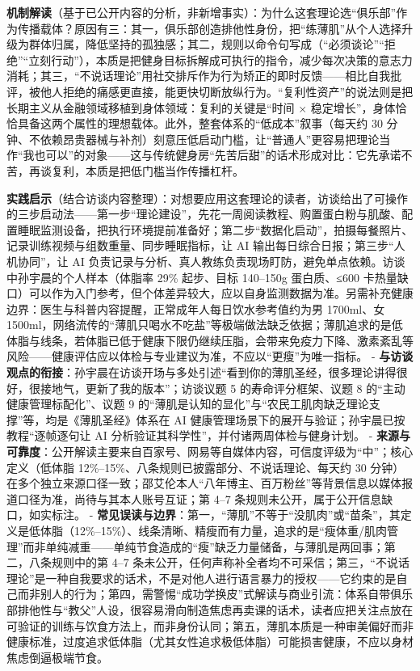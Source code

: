 \textbf{机制解读}（基于已公开内容的分析，非新增事实）：为什么这套理论选``俱乐部''作为传播载体？原因有三：其一，俱乐部创造排他性身份，把``练薄肌''从个人选择升级为群体归属，降低坚持的孤独感；其二，规则以命令句写成（``必须谈论''``拒绝''``立刻行动''），本质是把健身目标拆解成可执行的指令，减少每次决策的意志力消耗；其三，``不说话理论''用社交排斥作为行为矫正的即时反馈------相比自我批评，被他人拒绝的痛感更直接，能更快切断放纵行为。``复利性资产''的说法则是把长期主义从金融领域移植到身体领域：复利的关键是``时间
×
稳定增长''，身体恰恰具备这两个属性的理想载体。此外，整套体系的``低成本''叙事（每天约
30
分钟、不依赖昂贵器械与补剂）刻意压低启动门槛，让``普通人''更容易把理论当作``我也可以''的对象------这与传统健身房``先苦后甜''的话术形成对比：它先承诺不苦，再谈复利，本质是把低门槛当作传播杠杆。

\textbf{实践启示}（结合访谈内容整理）：对想要应用这套理论的读者，访谈给出了可操作的三步启动法------第一步``理论建设''，先花一周阅读教程、购置蛋白粉与肌酸、配置睡眠监测设备，把执行环境提前准备好；第二步``数据化启动''，拍摄每餐照片、记录训练视频与组数重量、同步睡眠指标，让
AI 输出每日综合日报；第三步``人机协同''，让 AI
负责记录与分析、真人教练负责现场盯防，避免单点依赖。访谈中孙宇晨的个人样本（体脂率
29\% 起步、目标 140--150g 蛋白质、≤600
卡热量缺口）可以作为入门参考，但个体差异较大，应以自身监测数据为准。另需补充健康边界：医生与科普内容提醒，正常成年人每日饮水参考值约为男
1700ml、女
1500ml，网络流传的``薄肌只喝水不吃盐''等极端做法缺乏依据；薄肌追求的是低体脂与线条，若体脂已低于健康下限仍继续压脂，会带来免疫力下降、激素紊乱等风险------健康评估应以体检与专业建议为准，不应以``更瘦''为唯一指标。
-
\textbf{与访谈观点的衔接}：孙宇晨在访谈开场与多处引述``看到你的薄肌圣经，很多理论讲得很好，很接地气，更新了我的版本''；访谈议题
5 的寿命评分框架、议题 8 的``主动健康管理标配化''、议题 9
的``薄肌是认知的显化''与``农民工肌肉缺乏理论支撑''等，均是《薄肌圣经》体系在
AI 健康管理场景下的展开与验证；孙宇晨已按教程``逐帧逐句让 AI
分析验证其科学性''，并付诸两周体检与健身计划。 -
\textbf{来源与可靠度}：公开解读主要来自百家号、网易等自媒体内容，可信度评级为``中''；核心定义（低体脂
12\%--15\%、八条规则已披露部分、不说话理论、每天约 30
分钟）在多个独立来源口径一致；邵艾伦本人``八年博主、百万粉丝''等背景信息以媒体报道口径为准，尚待与其本人账号互证；第
4--7 条规则未公开，属于公开信息缺口，如实标注。 -
\textbf{常见误读与边界}：第一，``薄肌''不等于``没肌肉''或``苗条''，其定义是低体脂（12\%--15\%）、线条清晰、精瘦而有力量，追求的是``瘦体重/肌肉管理''而非单纯减重------单纯节食造成的``瘦''缺乏力量储备，与薄肌是两回事；第二，八条规则中的第
4--7
条未公开，任何声称补全者均不可采信；第三，``不说话理论''是一种自我要求的话术，不是对他人进行语言暴力的授权------它约束的是自己而非别人的行为；第四，需警惕``成功学换皮''式解读与商业引流：体系自带俱乐部排他性与``教父''人设，很容易滑向制造焦虑再卖课的话术，读者应把关注点放在可验证的训练与饮食方法上，而非身份认同；第五，薄肌本质是一种审美偏好而非健康标准，过度追求低体脂（尤其女性追求极低体脂）可能损害健康，不应以身材焦虑倒逼极端节食。

